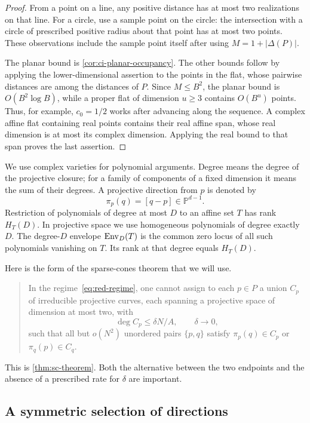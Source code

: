 \begin{proof}
From a point on a line, any positive distance has at most two realizations on that line. For a circle, use a sample point on the circle: the intersection with a circle of prescribed positive radius about that point has at most two points. These observations include the sample point itself after using $M=1+|\Delta(P)|$.

The planar bound is \cref{cor:ci-planar-occupancy}. The other bounds follow by applying the lower-dimensional assertion to the points in the flat, whose pairwise distances are among the distances of $P$. Since $M\le B^2$, the planar bound is $O(B^2\log B)$, while a proper flat of dimension $u\ge3$ contains $O(B^u)$ points. Thus, for example, $c_0=1/2$ works after advancing along the sequence. A complex affine flat containing real points contains their real affine span, whose real dimension is at most its complex dimension. Applying the real bound to that span proves the last assertion.
\end{proof}

We use complex varieties for polynomial arguments. Degree means the degree of the projective closure; for a family of components of a fixed dimension it means the sum of their degrees. A projective direction from $p$ is denoted by
\[
 \pi_p(q)=[q-p]\in\mathbb{P}^{d-1}.
\]
Restriction of polynomials of degree at most $D$ to an affine set $T$ has rank $H_T(D)$. In projective space we use homogeneous polynomials of degree exactly $D$. The degree-$D$ envelope $\operatorname{Env}_D(T)$ is the common zero locus of all such polynomials vanishing on $T$. Its rank at that degree equals $H_T(D)$.

Here is the form of the sparse-cones theorem that we will use.

\begin{quote}
In the regime~\eqref{eq:red-regime}, one cannot assign to each $p\in P$ a union $C_p$ of irreducible projective curves, each spanning a projective space of dimension at most two, with
\[
 \deg C_p\le\delta N/A,\qquad\delta\to0,
\]
such that all but $o(N^2)$ unordered pairs $\{p,q\}$ satisfy $\pi_p(q)\in C_p$ or $\pi_q(p)\in C_q$.
\end{quote}
This is \cref{thm:sc-theorem}. Both the alternative between the two endpoints and the absence of a prescribed rate for $\delta$ are important.

\subsection{A symmetric selection of directions}


